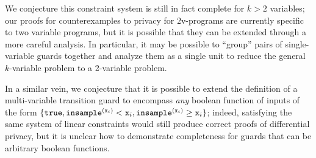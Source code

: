 We conjecture this constraint system is still in fact complete for $k>2$ variables; our proofs for counterexamples to privacy for $2$v-programs are currently specific to two variable programs, but it is possible that they can be extended through a more careful analysis. In particular, it may be possible to ``group'' pairs of single-variable guards together and analyze them as a single unit to reduce the general $k$-variable problem to a 2-variable problem. 

In a similar vein, we conjecture that it is possible to extend the definition of a multi-variable transition guard to encompass \textit{any} boolean function of inputs of the form $\{\texttt{true}, \mvlguard[\texttt{x}_i], \mvgguard[\texttt{x}_i]\}$; indeed, satisfying the same system of linear constraints would still produce correct proofs of differential privacy, but it is unclear how to demonstrate completeness for guards that can be arbitrary boolean functions. 
